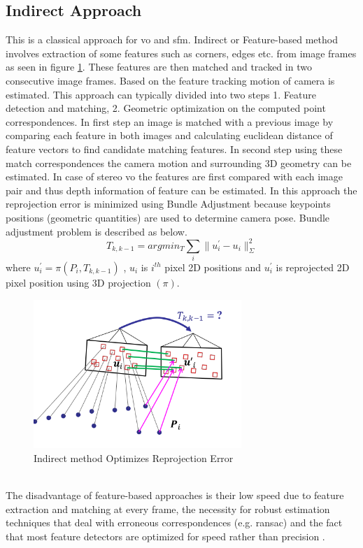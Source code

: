 \subsection{Indirect Approach}
This is a classical approach for \acrshort{vo} and \acrshort{sfm}. Indirect or Feature-based method involves extraction of some features such as corners, edges etc. from image frames as seen in figure \ref{fig:feature}. These features are then matched and tracked in two consecutive image frames. Based on the feature tracking motion of camera is estimated. This approach can typically divided into two steps 1. Feature detection and matching, 2. Geometric optimization on the computed point correspondences. In first step an image is matched with a previous image by comparing each feature in both images and calculating euclidean distance of feature vectors to find candidate matching features\cite{Aqel-et-al-2016}. In second step using these match correspondences the camera motion and surrounding 3D geometry can be estimated. In case of stereo \acrshort{vo} the features are first compared with each image pair and thus depth information of feature can be estimated. In this approach the reprojection error is minimized using Bundle Adjustment because keypoints positions (geometric quantities) are used to determine camera pose. Bundle adjustment problem is described as below. 
\begin{equation*}
	T_{k,k-1} = arg min_{T} \sum_{i} \| u^{'}_{i}- u_{i}\|^{2}_{\Sigma}
\end{equation*}
where   $u^{'}_{i} = \pi (P_{i},T_{k,k-1})$ , $ u_{i} $ is $ i^{th} $  pixel 2D positions and $ u^{'}_{i} $ is reprojected 2D pixel position using 3D projection $(\pi)$.  
\newline
\begin{figure}[h]
	\centering
	\includegraphics[width=0.7\textwidth]{indirect}
	\caption{Indirect method Optimizes Reprojection Error \cite{lecture}}
	\label{fig:feature}
\end{figure}
\\
The disadvantage of feature-based approaches is their low speed due to feature extraction and matching at every frame, the necessity for robust estimation techniques that deal with erroneous correspondences (e.g. \acrshort{ransac}) and the fact that most feature detectors are optimized for speed rather than precision \cite{7782863}.

